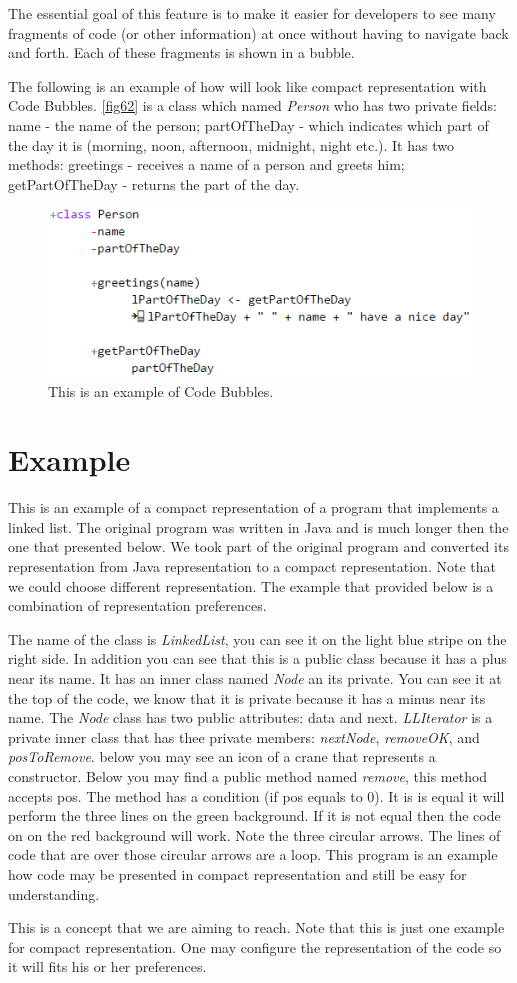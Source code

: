 The essential goal of this feature is to make it easier for developers to see many fragments of code (or other information) at once without having to navigate back and forth. Each of these fragments is shown in a bubble.

The following is an example of how will look like compact representation with Code Bubbles. \autoref{fig62} is a class which named \textit{Person} who has two private fields: name - the name of the person; partOfTheDay - which indicates which part of the day it is (morning, noon, afternoon, midnight, night etc.). It has two methods: greetings - receives a name of a person and greets him; getPartOfTheDay - returns the part of the day.
\begin{figure}[H]
\includegraphics{"./fig/Code Bubbles"}
\caption{This is an example of Code Bubbles.}
\label{fig62}
\end{figure}

\section{Example}
This is an example of a compact representation  of a program that implements a linked list. The original program was written in Java and is much longer then the one that presented below. We took part of the original program and converted its representation from Java representation to a compact representation. Note that we could choose different representation. The example that provided below is a combination of representation preferences.

The name of the class is \textit{LinkedList}, you can see it on the light blue stripe on the right side. In addition you can see that this is a public class because it has a plus near its name. It has an inner class named \textit{Node} an its private. You can see it at the top of the code, we know that it is private because it has a minus near its name. The \textit{Node} class has two public attributes: data and next. \textit{LLIterator} is a private inner class that has thee private members: \textit{nextNode}, \textit{removeOK}, and \textit{posToRemove}. below you may see an icon of a crane that represents a constructor. Below you may find a public method named \textit{remove}, this method accepts pos. The method has a condition (if pos equals to 0). It is is equal it will perform the three lines on the green background. If it is not equal then the code on on the red background will work. Note the three circular arrows. The lines of code that are over those circular arrows are a loop. This program is an example how code may be presented in compact representation and still be easy for understanding.

This is a concept that we are aiming to reach. Note that this is just one example for compact representation. One may configure the representation of the code so it will fits his or her preferences.
